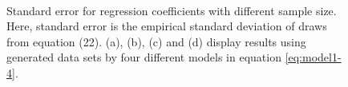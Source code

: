 \documentclass[twoside,11pt]{article}
\begin{document}
\begin{figure}[h]
	\\
	\caption{Standard error for regression coefficients with different sample size. Here, standard error is the empirical standard deviation of draws from equation (22). (a), (b), (c)  and (d) display results using generated data sets by four different models in equation \eqref{eq:model1-4}.}
	\label{fig:std}
\end{figure}
\end{document}
